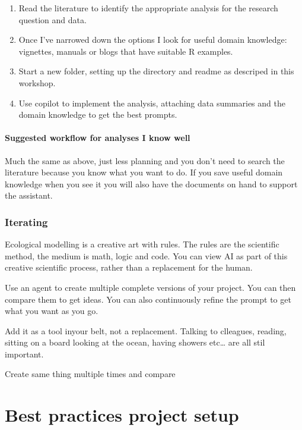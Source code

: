 \documentclass[
  letterpaper,
  DIV=11,
  numbers=noendperiod]{scrreprt}
\begin{document}
\begin{enumerate}
\def\labelenumi{\arabic{enumi}.}
\item
  Read the literature to identify the appropriate analysis for the
  research question and data.
\item
  Once I've narrowed down the options I look for useful domain
  knowledge: vignettes, manuals or blogs that have suitable R examples.
\item
  Start a new folder, setting up the directory and readme as descriped
  in this workshop.
\item
  Use copilot to implement the analysis, attaching data summaries and
  the domain knowledge to get the best prompts.
\end{enumerate}

\subsubsection{Suggested workflow for analyses I know
well}\label{suggested-workflow-for-analyses-i-know-well}

Much the same as above, just less planning and you don't need to search
the literature because you know what you want to do. If you save useful
domain knowledge when you see it you will also have the documents on
hand to support the assistant.

\subsection{Iterating}\label{iterating}

Ecological modelling is a creative art with rules. The rules are the
scientific method, the medium is math, logic and code. You can view AI
as part of this creative scientific process, rather than a replacement
for the human.

Use an agent to create multiple complete versions of your project. You
can then compare them to get ideas. You can also continuously refine the
prompt to get what you want as you go.

Add it as a tool inyour belt, not a replacement. Talking to clleagues,
reading, sitting on a board looking at the ocean, having showers
etc\ldots{} are all stil important.

Create same thing multiple times and compare


\chapter{Best practices project
setup}\label{best-practices-project-setup}
\end{document}
